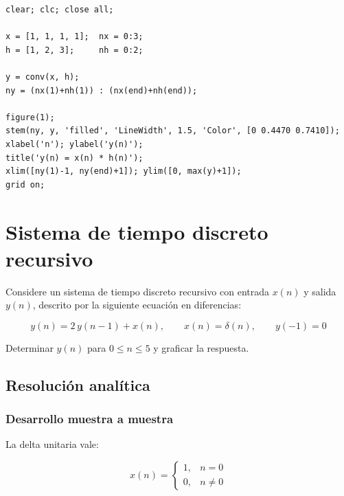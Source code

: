 \documentclass[../Main_Include.tex]{subfiles}
\begin{document}
\begin{lstlisting}[style=matlab_dark,
    caption={Ejercicio 2 --- Convoluci\'on lineal discreta},
    label={lst:ej2}]
% ETN1015 - Ejercicio 2: Convolucion lineal discreta
clear; clc; close all;

x = [1, 1, 1, 1];  nx = 0:3;
h = [1, 2, 3];     nh = 0:2;

y = conv(x, h);
ny = (nx(1)+nh(1)) : (nx(end)+nh(end));

figure(1);
stem(ny, y, 'filled', 'LineWidth', 1.5, 'Color', [0 0.4470 0.7410]);
xlabel('n'); ylabel('y(n)');
title('y(n) = x(n) * h(n)');
xlim([ny(1)-1, ny(end)+1]); ylim([0, max(y)+1]);
grid on;
\end{lstlisting}

\newpage
\section{Sistema de tiempo discreto recursivo}

Considere un sistema de tiempo discreto recursivo con entrada $x(n)$
y salida $y(n)$, descrito por la siguiente ecuación en diferencias:

\[
    y(n) = 2\,y(n-1) + x(n), \qquad x(n) = \delta(n), \qquad y(-1) = 0
\]

Determinar $y(n)$ para $0 \le n \le 5$ y graficar la respuesta.

\subsection*{Resolución analítica}

\subsubsection*{Desarrollo muestra a muestra}

La delta unitaria vale:

\[
    x(n) = \begin{cases} 1, & n = 0 \\ 0, & n \neq 0 \end{cases}
\]
\end{document}
